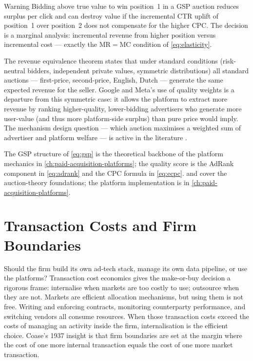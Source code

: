 \begin{admonition}{Warning}
Bidding above true value to win position~1 in a GSP auction reduces surplus per click and can
destroy value if the incremental CTR uplift of position~1 over position~2 does not compensate
for the higher CPC. The decision is a marginal analysis: incremental revenue from higher position
versus incremental cost --- exactly the \(\mathrm{MR}=\mathrm{MC}\) condition of
\cref{eq:elasticity}.
\end{admonition}

The revenue equivalence theorem states that under standard conditions (risk-neutral bidders,
independent private values, symmetric distributions) all standard auctions --- first-price,
second-price, English, Dutch --- generate the same expected revenue for the seller. Google and
Meta's use of quality weights is a departure from this symmetric case: it allows the platform to
extract more revenue by ranking higher-quality, lower-bidding advertisers who generate more
user-value (and thus more platform-side surplus) than pure price would imply. The mechanism
design question --- which auction maximises a weighted sum of advertiser and platform welfare ---
is active in the literature \parencite{mankiw2020}.

The GSP structure of \cref{eq:gsp} is the theoretical backbone of the platform mechanics in
\cref{ch:paid-acquisition-platforms}; the quality score is the AdRank component in \cref{eq:adrank}
and the CPC formula in \cref{eq:ecpc}. \textcite{mankiw2020} and \textcite{dranove7theconomics}
cover the auction-theory foundations; the platform implementation is in \cref{ch:paid-acquisition-platforms}.

\section{Transaction Costs and Firm Boundaries}\label{sec:transaction-costs}

Should the firm build its own ad-tech stack, manage its own data pipeline, or use the platforms?
Transaction cost economics gives the make-or-buy decision a rigorous frame: internalise when
markets are too costly to use; outsource when they are not. Markets are efficient allocation
mechanisms, but using them is not free. Writing and enforcing contracts, monitoring counterparty
performance, and switching vendors all consume resources. When those transaction costs exceed the
costs of managing an activity inside the firm, internalisation is the efficient choice. Coase's
1937 insight is that firm boundaries are set at the margin where the cost of one more internal
transaction equals the cost of one more market transaction.

